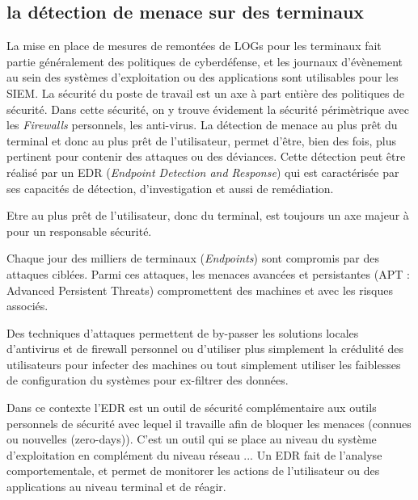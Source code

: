 

\subsection{la détection de menace sur des terminaux}

La mise en place de mesures de remontées de LOGs pour les terminaux fait partie généralement des politiques de cyberdéfense, et les journaux d'évènement au sein des systèmes d'exploitation ou des applications sont utilisables pour les SIEM.
La sécurité du poste de travail est un axe à part entière des politiques de sécurité. Dans cette sécurité, on y trouve évidement la sécurité périmètrique avec les \textit{Firewalls} personnels, les anti-virus. La détection de menace au plus prêt du terminal et donc au plus prêt de l'utilisateur, permet d'être, bien des fois, plus pertinent pour contenir des attaques ou des déviances. Cette détection peut être réalisé par un EDR (\textit{Endpoint Detection and Response}) qui est caractérisée par ses capacités de détection, d’investigation et aussi de remédiation.

Etre au plus prêt de l'utilisateur, donc du terminal, est toujours un axe majeur à pour un responsable sécurité.

Chaque jour des milliers de terminaux (\textit{Endpoints}) sont compromis par des attaques ciblées. Parmi ces attaques, les menaces avancées et persistantes (APT : Advanced Persistent Threats) compromettent des machines et avec les risques associés. 

Des techniques d'attaques permettent de by-passer les solutions locales d'antivirus et de firewall personnel ou d'utiliser plus simplement la crédulité des utilisateurs pour infecter des machines ou tout simplement utiliser les faiblesses de configuration du systèmes pour ex-filtrer des données.

Dans ce contexte l’EDR est un outil de sécurité complémentaire aux outils personnels de sécurité avec lequel il travaille afin de bloquer les menaces (connues ou nouvelles (zero-days)). C’est un outil qui se place au niveau du système d'exploitation en complément du niveau réseau ...  Un EDR fait de l’analyse comportementale, et permet de monitorer les actions de l'utilisateur ou des applications au niveau  terminal et de réagir.

